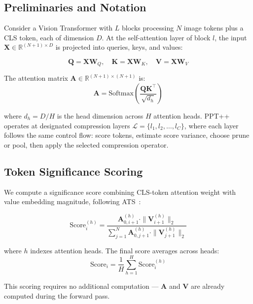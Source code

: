 \documentclass[10pt,twocolumn,letterpaper]{article}
\begin{document}
\subsection{Preliminaries and Notation}

Consider a Vision Transformer with $L$ blocks processing $N$ image tokens plus
a CLS token, each of dimension $D$. At the self-attention layer of block $l$,
the input $\mathbf{X} \in \mathbb{R}^{(N+1) \times D}$ is projected into
queries, keys, and values:

\begin{equation}
\mathbf{Q} = \mathbf{X}\mathbf{W}_Q, \quad
\mathbf{K} = \mathbf{X}\mathbf{W}_K, \quad
\mathbf{V} = \mathbf{X}\mathbf{W}_V
\end{equation}

The attention matrix $\mathbf{A} \in \mathbb{R}^{(N+1) \times (N+1)}$ is:
\begin{equation}
\mathbf{A} = \text{Softmax}\!\left(\frac{\mathbf{Q}\mathbf{K}^\top}{\sqrt{d_h}}\right)
\end{equation}

where $d_h = D/H$ is the head dimension across $H$ attention heads. PPT++
operates at designated compression layers $\mathcal{L} = \{l_1, l_2, \ldots, l_C\}$,
where each layer follows the same control flow: score tokens, estimate score
variance, choose prune or pool, then apply the selected compression operator.


\subsection{Token Significance Scoring}
\label{sec:scoring}

We compute a significance score combining CLS-token attention weight with
value embedding magnitude, following ATS~\cite{fayyaz2022adaptive}:

\begin{equation}
\label{eq:scoring}
\text{Score}_i^{(h)} = \frac{\mathbf{A}_{0,i+1}^{(h)} \cdot \|\mathbf{V}_{i+1}^{(h)}\|_2}
{\sum_{j=1}^{N} \mathbf{A}_{0,j+1}^{(h)} \cdot \|\mathbf{V}_{j+1}^{(h)}\|_2}
\end{equation}

where $h$ indexes attention heads. The final score averages across heads:
\begin{equation}
\text{Score}_i = \frac{1}{H}\sum_{h=1}^{H} \text{Score}_i^{(h)}
\end{equation}

This scoring requires no additional computation --- $\mathbf{A}$ and $\mathbf{V}$
are already computed during the forward pass.
\end{document}
